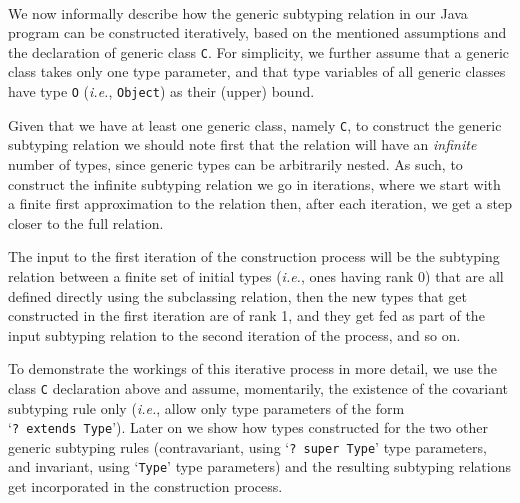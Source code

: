 \documentclass[twocolumn,english]{article}
\numberwithin{equation}{section}
\numberwithin{figure}{section}
\newcommand{\code}[1]{\texttt{#1}}
\begin{document}
\noindent \begin{center}
\begin{figure}
\noindent \begin{centering}
~~~~~
\par\end{centering}

\protect\caption{}
\end{figure}

\par\end{center}

We now informally describe how the generic subtyping relation in our
Java program can be constructed iteratively, based on the mentioned
assumptions and the declaration of generic class \code{C}. For simplicity,
we further assume that a generic class takes only one type parameter,
and that type variables of all generic classes have type \code{O}
(\emph{i.e.}, \code{Object}) as their (upper) bound.

Given that we have at least one generic class, namely \code{C}, to
construct the generic subtyping relation we should note first that
the relation will have an \emph{infinite} number of types, since generic
types can be arbitrarily nested. As such, to construct the infinite
subtyping relation we go in iterations, where we start with a finite
first approximation to the relation then, after each iteration, we
get a step closer to the full relation.

The input to the first iteration of the construction process will
be the subtyping relation between a finite set of initial types (\emph{i.e.},
ones having rank 0) that are all defined directly using the subclassing
relation, then the new types that get constructed in the first iteration
are of rank 1, and they get fed as part of the input subtyping relation
to the second iteration of the process, and so on.

To demonstrate the workings of this iterative process in more detail,
we use the class \code{C} declaration above and assume, momentarily,
the existence of the covariant subtyping rule only (\emph{i.e.}, allow
only type parameters of the form `\code{?~extends~Type}'). Later
on we show how types constructed for the two other generic subtyping
rules (contravariant, using `\code{?~super~Type}' type parameters,
and invariant, using `\code{Type}' type parameters) and the resulting
subtyping relations get incorporated in the construction process.
\end{document}
